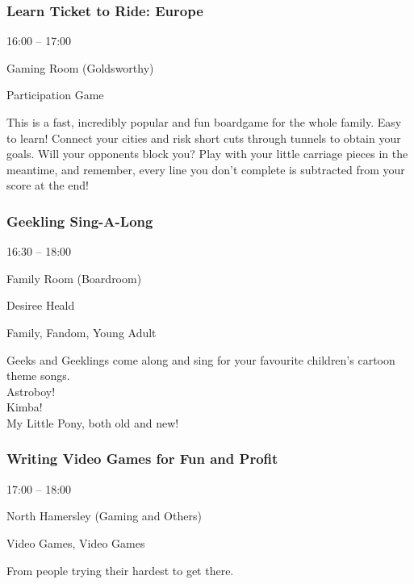 \documentclass{scrreprt}
\begin{document}
\begin{multicols}{2}
\subsubsection*{Learn Ticket to Ride: Europe}\begin{description}
\setlength{\itemsep}{0pt}
\setlength{\parsep}{0pt}
\setlength{\parskip}{0pt}
\item[Time:]{16:00 -- 17:00}
\item[Venue:]{Gaming Room (Goldsworthy)}
\item[Tags:]{Participation Game}\end{description}
This is a fast, incredibly popular and fun boardgame for the whole family. Easy to learn! Connect your cities and risk short cuts through tunnels to obtain your goals. Will your opponents block you? Play with your little carriage pieces in the meantime, and remember, every line you don't complete is subtracted from your score at the end!
\subsubsection*{Geekling Sing-A-Long}\begin{description}
\setlength{\itemsep}{0pt}
\setlength{\parsep}{0pt}
\setlength{\parskip}{0pt}
\item[Time:]{16:30 -- 18:00}
\item[Venue:]{Family Room (Boardroom)}
\item[People:]{Desiree Heald}
\item[Tags:]{Family, Fandom, Young Adult}\end{description}
Geeks and Geeklings come along and sing for your favourite children's cartoon theme songs. \\Astroboy!\\Kimba!\\My Little Pony, both old and new!
\subsubsection*{Writing Video Games for Fun and Profit}\begin{description}
\setlength{\itemsep}{0pt}
\setlength{\parsep}{0pt}
\setlength{\parskip}{0pt}
\item[Time:]{17:00 -- 18:00}
\item[Venue:]{North Hamersley (Gaming and Others)}
\item[Tags:]{Video Games, Video Games}\end{description}
From people trying their hardest to get there.

\end{multicols}
\end{document}
